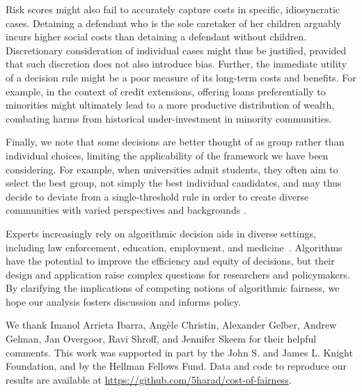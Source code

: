 \documentclass[sigconf]{acmart}
\begin{document}
Risk scores might also fail to accurately capture costs in specific, idiosyncratic cases. Detaining a defendant who is the sole caretaker of her children arguably incurs higher social costs than detaining a defendant without children. Discretionary consideration of individual cases might thus be justified, provided that such discretion does not also introduce bias.
Further, the immediate utility of a decision rule might be a poor measure of its long-term costs and benefits.
For example, in the context of credit extensions, offering loans preferentially to minorities might ultimately lead to a more productive distribution of wealth, combating harms from historical under-investment in minority communities. 

Finally, we note that some decisions are better thought of as group rather than individual choices, limiting the applicability of the framework we have been considering. For example, when universities admit students, they often aim to select the best group, not simply the best individual candidates, and may thus decide to deviate from a single-threshold rule in order to create diverse communities with varied perspectives and backgrounds \cite{page2008difference}.

Experts increasingly rely on algorithmic decision aids in diverse settings, including law enforcement, education, employment, and medicine~\cite{barocas2016big,berk2012criminal,goel2016-risky,goel2016precinct,jung2017}.
Algorithms have the potential to improve the efficiency and equity of decisions,
but their design and application 
raise complex questions for researchers and policymakers.
By clarifying the implications of competing notions of algorithmic fairness, we hope our analysis 
fosters discussion and informs policy.

\begin{acks}
We thank Imanol Arrieta Ibarra, Ang{\`e}le Christin, 
Alexander Gelber, Andrew Gelman, 
Jan Overgoor, Ravi Shroff, and Jennifer Skeem 
for their helpful comments.
This work was supported in part by the John S. and James L. Knight Foundation,
and by the Hellman Fellows Fund.
Data and code to reproduce our results are available at \url{https://github.com/5harad/cost-of-fairness}.
\end{acks}

\balance


\end{document}
